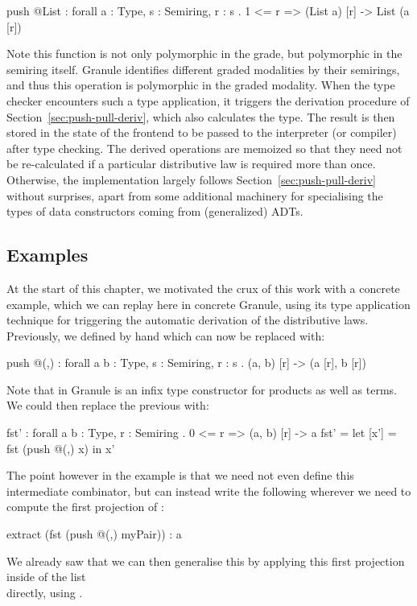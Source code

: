 \begin{granule}
push @List : forall { a : Type, s : Semiring, r : s } 
           . {1 <= r} => (List a) [r] -> List (a [r])
\end{granule}
 Note this function is not only polymorphic in the grade, but polymorphic in the
 semiring itself. Granule identifies different graded modalities by their
 semirings, and thus this operation is polymorphic in the graded modality. When
 the type checker encounters such a type application, it triggers the derivation
 procedure of Section~\ref{sec:push-pull-deriv}, which also calculates the type. The
 result is then stored in the state of the frontend to be passed to the
 interpreter (or compiler) after type checking. The derived operations are
 memoized so that they need not be re-calculated if a particular distributive
 law is required more than once. Otherwise, the implementation largely follows
 Section~\ref{sec:push-pull-deriv} without surprises, apart from some additional
 machinery for specialising the types of data constructors coming from
 (generalized) ADTs.
 
 \subsection{Examples}
 At the start of this chapter, we motivated the crux of this work with a concrete
 example, which we can replay here in concrete Granule, using its type
 application technique for triggering the automatic derivation of the
 distributive laws. Previously, we defined  by hand which can
 now be replaced with:
\begin{granule}
push @(,) : forall { a b : Type, s : Semiring, r : s } 
          . (a, b) [r] -> (a [r], b [r])
\end{granule}
 Note that in Granule \granin{(,)} is an infix type constructor for products as
 well as terms. We could then replace the previous 
 with:
\begin{granule}
fst' : forall { a b : Type, r : Semiring } 
     . {0 <= r} => (a, b) [r] -> a
fst' = let [x'] = fst (push @(,) x) in x'
\end{granule}
 The point however in the example is that we need not even define this
 intermediate combinator, but can instead write the following
 wherever we need to compute the first projection
 of :
\begin{granule}
extract (fst (push @(,) myPair)) : a
\end{granule}
 We already saw that we can then generalise this by applying
 this first projection inside of the list \\  directly, using .
 
